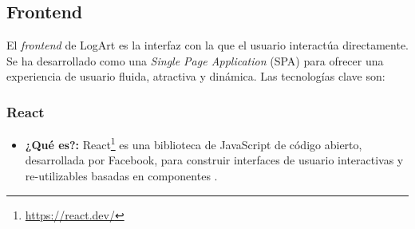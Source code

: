 \subsection{Frontend}
\label{sec:frontendTech}

El \textit{frontend} de LogArt es la interfaz con la que el usuario interactúa directamente. Se ha desarrollado como una \textit{Single Page Application} (SPA) para ofrecer una experiencia de usuario fluida, atractiva y dinámica. Las tecnologías clave son:

\subsubsection{React}
\label{sec:react}

    \begin{itemize}
        \item \textbf{¿Qué es?:} React\footnote{\url{https://react.dev/}} es una biblioteca de JavaScript de código abierto, desarrollada por Facebook, para construir interfaces de usuario interactivas y re-utilizables basadas en componentes \cite{kinstaQueEsReactJS}.


\end{itemize}
